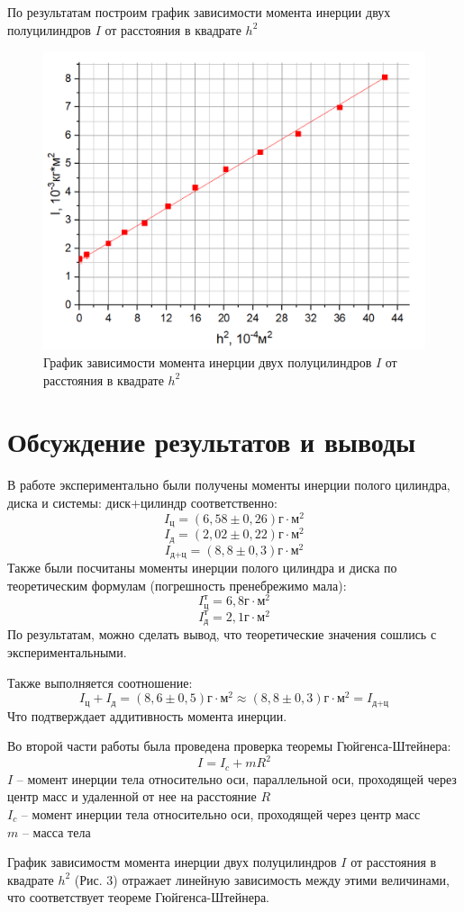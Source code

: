 \documentclass[a4paper,12pt]{article} %
\begin{document}
По результатам построим график зависимости момента инерции двух полуцилиндров $I$ от расстояния в квадрате $h^2$
\begin{figure}[!h]
\centering
\includegraphics[scale=0.36]{4}
\caption{График зависимости момента инерции двух полуцилиндров $I$ от расстояния в квадрате $h^2$}
\end{figure}
\section{Обсуждение результатов и выводы}
В работе экспериментально были получены моменты инерции полого цилиндра, диска и системы: диск+цилиндр соответственно:
\[I_\text{ц} = (6,58\pm 0,26)\text{г}\cdot \text{м}^2\]
\[I_\text{д} = (2,02\pm 0,22)\text{г}\cdot \text{м}^2\]
\[I_\text{д+ц} = (8,8\pm 0,3)\text{г}\cdot \text{м}^2\]
Также были посчитаны моменты инерции полого цилиндра и диска по теоретическим формулам (погрешность пренебрежимо мала):
\[I_\text{ц}^\text{т} = 6,8\text{г}\cdot \text{м}^2\]
\[I_\text{д}^\text{т} = 2,1\text{г}\cdot \text{м}^2\]
По результатам, можно сделать вывод, что теоретические значения сошлись с экспериментальными.

Также выполняется соотношение:
\[I_\text{ц}+I_\text{д} = (8,6\pm 0,5)\text{г}\cdot \text{м}^2\approx (8,8\pm 0,3)\text{г}\cdot \text{м}^2 =  I_\text{д+ц} \]
Что подтверждает аддитивность момента инерции. 

Во второй части работы была проведена проверка теоремы Гюйгенса-Штейнера:
\[I = I_c + mR^2\]
$I$ -- момент инерции тела относительно оси, параллельной оси, проходящей через центр масс и удаленной от нее на расстояние $R$\\
$I_c$ -- момент инерции тела относительно оси, проходящей через центр масс\\
$m$ -- масса тела

График зависимостм момента инерции двух полуцилиндров $I$ от расстояния в квадрате $h^2$ (Рис. 3) отражает линейную зависимость между этими величинами, что соответствует теореме Гюйгенса-Штейнера.
\end{document}
